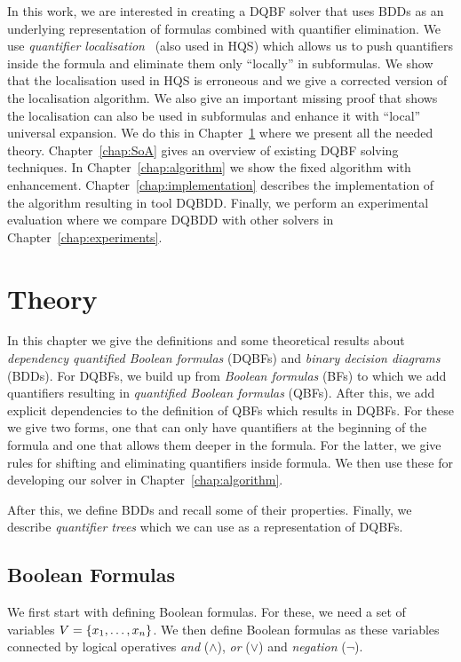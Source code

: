 \documentclass[
  digital, %
  color,
  twoside, %
  table,   %
  nolof,     %
  nolot,     %
]{fithesis3}
\let\setbuilder\set
\newcommand{\simpleset}[1]{\{{#1}\}}
\renewcommand{\set}[1]{\normalexpandarg\IfSubStr{#1}{|}{\setbuilder{#1}}{\simpleset{#1}}}
\theoremstyle{definition}
\theoremstyle{remark}
\begin{document}
In this work, we are interested in creating a DQBF solver that uses BDDs as an underlying representation of formulas combined with quantifier elimination. We use \emph{quantifier localisation}~\cite{HQSquantifierLocalisation} (also used in HQS) which allows us to push quantifiers inside the formula and eliminate them only ``locally'' in subformulas. We show that the localisation used in HQS is erroneous and we give a corrected version of the localisation algorithm. We also give an important missing proof that shows the localisation can also be used in subformulas and enhance it with ``local'' universal expansion. We do this in Chapter~\ref{chap:theory} where we present all the needed theory. Chapter~\ref{chap:SoA} gives an overview of existing DQBF solving techniques. In Chapter~\ref{chap:algorithm} we show the fixed algorithm with enhancement. Chapter~\ref{chap:implementation} describes the implementation of the algorithm resulting in tool DQBDD. Finally, we perform an experimental evaluation where we compare DQBDD with other solvers in Chapter~\ref{chap:experiments}.

\chapter{Theory}
\label{chap:theory}
In this chapter we give the definitions and some theoretical results about \emph{dependency quantified Boolean formulas} (DQBFs) and \emph{binary decision diagrams} (BDDs). For DQBFs, we build up from \emph{Boolean formulas} (BFs) to which we add quantifiers resulting in \emph{quantified Boolean formulas} (QBFs). After this, we add explicit dependencies to the definition of QBFs which results in DQBFs. For these we give two forms, one that can only have quantifiers at the beginning of the formula and one that allows them deeper in the formula. For the latter, we give rules for shifting and eliminating quantifiers inside formula. We then use these for developing our solver in Chapter~\ref{chap:algorithm}. 

After this, we define BDDs and recall some of their properties. Finally, we describe \emph{quantifier trees} which we can use as a representation of DQBFs.

\section{Boolean Formulas}
We first start with defining Boolean formulas. For these, we need a set of variables $V = \set{x_1, \dots, x_n}$. We then define Boolean formulas as these variables connected by logical operatives \emph{and} (${\land}$), \emph{or} (${\lor}$) and \emph{negation} (${\neg}$).
\end{document}

